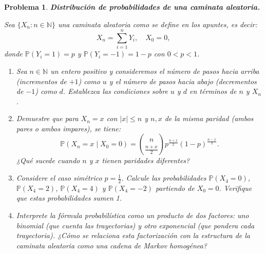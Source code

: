 \documentclass[12pt]{article}
\newtheorem{problem}{Problema}
\begin{document}
\begin{problem}
\textbf{Distribución de probabilidades de una caminata aleatoria.}

Sea $\{X_n : n \in \mathbb{N}\}$ una caminata aleatoria como se define en los apuntes, es decir:
\[
X_n = \sum_{i=1}^n Y_i, \quad X_0 = 0,
\]
donde $\mathbb{P}(Y_i = 1) = p$ y $\mathbb{P}(Y_i = -1) = 1-p$ con $0 < p < 1$.

\begin{enumerate}
    \item[(a)] Sea $n \in \mathbb{N}$ un entero positivo y consideremos el número de pasos hacia arriba (incrementos de $+1$) como $u$ y el número de pasos hacia abajo (decrementos de $-1$) como $d$. Establezca las condiciones sobre $u$ y $d$ en términos de $n$ y $X_n$.
    
    \item[(b)] Demuestre que para $X_n = x$ con $|x| \leq n$ y $n, x$ de la misma paridad (ambos pares o ambos impares), se tiene:
    \[
    \mathbb{P}(X_n = x \mid X_0 = 0) = \binom{n}{\frac{n+x}{2}} p^{\frac{n+x}{2}} (1-p)^{\frac{n-x}{2}}.
    \]
    ¿Qué sucede cuando $n$ y $x$ tienen paridades diferentes?
    
    \item[(c)] Considere el caso simétrico $p = \frac{1}{2}$. Calcule las probabilidades $\mathbb{P}(X_4 = 0)$, $\mathbb{P}(X_4 = 2)$, $\mathbb{P}(X_4 = 4)$ y $\mathbb{P}(X_4 = -2)$ partiendo de $X_0 = 0$. Verifique que estas probabilidades sumen 1.
    
    \item[(d)] Interprete la fórmula probabilística como un producto de dos factores: uno binomial (que cuenta las trayectorias) y otro exponencial (que pondera cada trayectoria). ¿Cómo se relaciona esta factorización con la estructura de la caminata aleatoria como una cadena de Markov homogénea?
\end{enumerate}
\end{problem}
\end{document}
